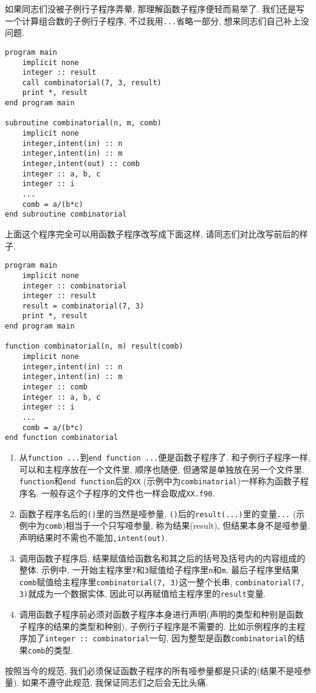 如果同志们没被子例行子程序弄晕, 那理解函数子程序便轻而易举了. 我们还是写一个计算组合数的子例行子程序, 不过我用\texttt{...}省略一部分, 想来同志们自己补上没问题.
\begin{lstlisting}
program main
    implicit none
    integer :: result
    call combinatorial(7, 3, result)
    print *, result
end program main

subroutine combinatorial(n, m, comb)
    implicit none
    integer,intent(in) :: n
    integer,intent(in) :: m
    integer,intent(out) :: comb
    integer :: a, b, c
    integer :: i
    ...
    comb = a/(b*c)
end subroutine combinatorial
\end{lstlisting}
上面这个程序完全可以用函数子程序改写成下面这样, 请同志们对比改写前后的样子.
\begin{lstlisting}
program main
    implicit none
    integer :: combinatorial
    integer :: result
    result = combinatorial(7, 3)
    print *, result
end program main

function combinatorial(n, m) result(comb)
    implicit none
    integer,intent(in) :: n
    integer,intent(in) :: m
    integer :: comb
    integer :: a, b, c
    integer :: i
    ...
    comb = a/(b*c)
end function combinatorial
\end{lstlisting}
\begin{enumerate}
    \item 从\texttt{function ...}到\texttt{end function ...}便是函数子程序了. 和子例行子程序一样, 可以和主程序放在一个文件里, 顺序也随便, 但通常是单独放在另一个文件里. \texttt{function}和\texttt{end function}后的\texttt{XX} (示例中为\texttt{combinatorial})一样称为函数子程序名. 一般存这个子程序的文件也一样会取成\texttt{XX.f90}.
    \item 函数子程序名后的\texttt{()}里的当然是哑参量, \texttt{()}后的\texttt{result(...)}里的变量\texttt{...} (示例中为\texttt{comb})相当于一个只写哑参量, 称为结果(result), 但结果本身不是哑参量. 声明结果时不需也不能加\texttt{,intent(out)}.
    \item 调用函数子程序后, 结果赋值给函数名和其之后的括号及括号内的内容组成的整体. 示例中, 一开始主程序里\texttt{7}和\texttt{3}赋值给子程序里\texttt{n}和\texttt{m}, 最后子程序里结果\texttt{comb}赋值给主程序里\texttt{combinatorial(7, 3)}这一整个长串, \texttt{combinatorial(7, 3)}就成为一个数据实体, 因此可以再赋值给主程序里的\texttt{result}变量.
    \item 调用函数子程序前必须对函数子程序本身进行声明(声明的类型和种别是函数子程序的结果的类型和种别), 子例行子程序是不需要的. 比如示例程序的主程序加了\texttt{integer :: combinatorial}一句, 因为整型是函数\texttt{combinatorial}的结果\texttt{comb}的类型.
\end{enumerate}
按照当今的规范, 我们必须保证函数子程序的所有哑参量都是只读的(结果不是哑参量). 如果不遵守此规范, 我保证同志们之后会无比头痛.

